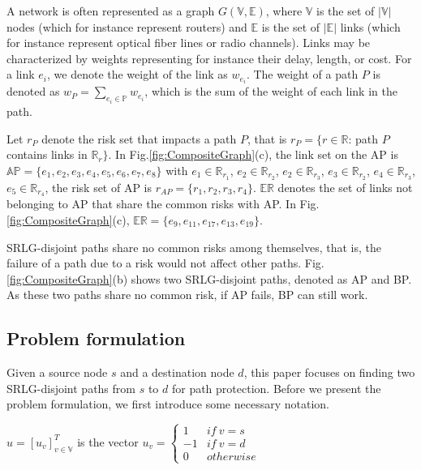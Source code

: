 A network is often represented as a graph $G(\mathbb{V},\mathbb{E})$, where $\mathbb{V}$ is the set of $|\mathbb{V}|$ nodes (which for instance represent routers) and $\mathbb{E}$ is the set of $|\mathbb{E}|$ links (which for instance represent optical fiber lines or radio channels). Links may be characterized by weights representing for instance their delay, length, or cost. For a link $e_i$, we denote the weight of the link as $w_{e_i}$. The weight of a path $P$ is denoted as $w_P=\sum\limits_{e_i\in \mathbb{P}}w_{e_i}$, which is the sum of  the weight of each link in the path.

Let $r_P$ denote the risk set that impacts a path $P$, that is $r_P=\{r\in \mathbb{R}$: path $P$ contains links in $\mathbb{R}_r\}$. In Fig.\ref{fig:CompositeGraph}(c), the link set on the AP is $\mathbb{AP}=\{e_1,e_2,e_3,e_4,e_5,e_6,e_7,e_8\}$ with $e_1\in \mathbb{R}_{r_1}$, $e_2\in \mathbb{R}_{r_2}$, $e_2\in \mathbb{R}_{r_3}$, $e_3\in \mathbb{R}_{r_2}$, $e_4\in \mathbb{R}_{r_3}$, $e_5\in \mathbb{R}_{r_4}$,  the risk set of AP is ${r}_{{AP}}=\{r_1, r_2, r_3, r_4\}$. $\mathbb{\mathbb{ER}}$ denotes the set of links not belonging to AP that share the common risks with AP. In Fig.\ref{fig:CompositeGraph}(c), $\mathbb{\mathbb{ER}}=\{e_9,e_{11},e_{17},e_{13},e_{19}\}$.

SRLG-disjoint paths share no common risks among themselves, that is, the failure of a path due to a risk would not affect other paths. Fig.\ref{fig:CompositeGraph}(b) shows two SRLG-disjoint paths, denoted as AP and BP. As these two paths share no common risk, if AP fails, BP can still work.
\subsection{Problem formulation}
Given a source node $s$ and a destination node $d$, this paper focuses on finding  two SRLG-disjoint paths from $s$ to $d$ for path protection. Before we present the problem formulation, we first introduce some necessary notation.
%
%
%
%



$u=[u_v]^T_{v\in \mathbb{V}}$ is the vector 
${{u_v}} = \left\{ {\begin{array}{*{20}{c}}
1&{if\ v=s}\\
{ - 1}&{if\ v=d}\\
0&{otherwise}
\end{array}} \right.$


